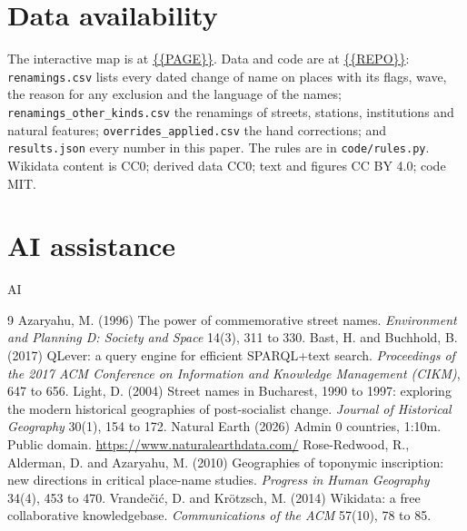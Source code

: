\documentclass[11pt,a4paper]{article}
\begin{document}
\section{Data availability}
The interactive map is at \url{{{PAGE}}}. Data and code are at \url{{{REPO}}}: \texttt{renamings.csv} lists every dated change of name on places with its flags, wave, the reason for any exclusion and the language of the names; \texttt{renamings\_other\_kinds.csv} the renamings of streets, stations, institutions and natural features; \texttt{overrides\_applied.csv} the hand corrections; and \texttt{results.json} every number in this paper. The rules are in \texttt{code/rules.py}. Wikidata content is CC0; derived data CC0; text and figures CC BY 4.0; code MIT.

\section*{AI assistance}
{{AI}}

\begin{thebibliography}{9}
 Azaryahu, M. (1996) The power of commemorative street names. \textit{Environment and Planning D: Society and Space} 14(3), 311 to 330.
 Bast, H. and Buchhold, B. (2017) QLever: a query engine for efficient SPARQL+text search. \textit{Proceedings of the 2017 ACM Conference on Information and Knowledge Management (CIKM)}, 647 to 656.
 Light, D. (2004) Street names in Bucharest, 1990 to 1997: exploring the modern historical geographies of post-socialist change. \textit{Journal of Historical Geography} 30(1), 154 to 172.
 Natural Earth (2026) Admin 0 countries, 1:10m. Public domain. \url{https://www.naturalearthdata.com/}
 Rose-Redwood, R., Alderman, D. and Azaryahu, M. (2010) Geographies of toponymic inscription: new directions in critical place-name studies. \textit{Progress in Human Geography} 34(4), 453 to 470.
 Vrande\v{c}i\'c, D. and Kr\"otzsch, M. (2014) Wikidata: a free collaborative knowledgebase. \textit{Communications of the ACM} 57(10), 78 to 85.
\end{thebibliography}
\end{document}
